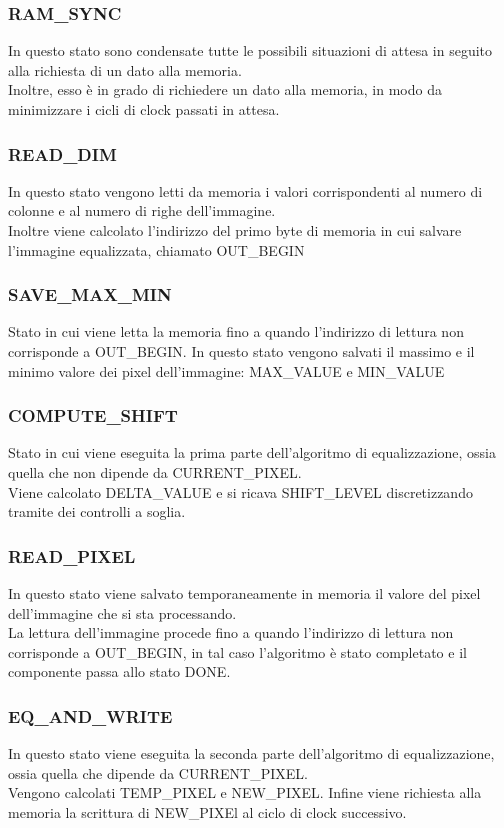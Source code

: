 \documentclass[a4paper, 12pt]{article}
\begin{document}
\subsubsection{RAM\_SYNC}
In questo stato sono condensate tutte le possibili situazioni di attesa in seguito alla richiesta di un dato alla memoria. \\
Inoltre, esso è in grado di richiedere un dato alla memoria, in modo da minimizzare i cicli di clock passati in attesa.
\subsubsection{READ\_DIM}
In questo stato vengono letti da memoria i valori corrispondenti al numero di colonne e al numero di righe dell'immagine. \\
Inoltre viene calcolato l'indirizzo del primo byte di memoria in cui salvare l'immagine equalizzata, chiamato OUT\_BEGIN
\subsubsection{SAVE\_MAX\_MIN}
Stato in cui viene letta la memoria fino a quando l'indirizzo di lettura non corrisponde a OUT\_BEGIN.
In questo stato vengono salvati il massimo e il minimo valore dei pixel dell'immagine: MAX\_VALUE e MIN\_VALUE
\subsubsection{COMPUTE\_SHIFT}
Stato in cui viene eseguita la prima parte dell'algoritmo di equalizzazione, ossia quella che non dipende da CURRENT\_PIXEL. \\
Viene calcolato DELTA\_VALUE e si ricava SHIFT\_LEVEL discretizzando tramite dei controlli a soglia.
\subsubsection{READ\_PIXEL}
In questo stato viene salvato temporaneamente in memoria il valore del pixel dell'immagine che si sta processando. \\
La lettura dell'immagine procede fino a quando l'indirizzo di lettura non corrisponde a OUT\_BEGIN, in tal caso l'algoritmo è stato completato e il componente passa allo stato DONE.
\subsubsection{EQ\_AND\_WRITE}
In questo stato viene eseguita la seconda parte dell'algoritmo di equalizzazione, ossia quella che dipende da CURRENT\_PIXEL. \\
Vengono calcolati TEMP\_PIXEL e NEW\_PIXEL.
Infine viene richiesta alla memoria la scrittura di NEW\_PIXEl al ciclo di clock successivo.
\end{document}
